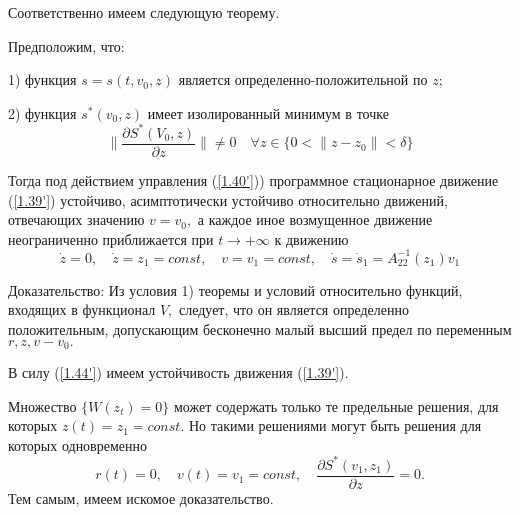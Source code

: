 Соответственно имеем следующую теорему.

\begin{theorem}\label{t-1.10}
Предположим, что:

1) функция $s = s(t, v_0, z)$ является определенно-положительной по $z$;

2) функция $s^{*} (v_0, z)$ имеет изолированный минимум в точке 
$$\| \frac{\partial S^{*} (V_0, z)}{\partial z} \| \ne 0 \quad \forall z \in \lbrace 0 < \| z - z_0 \| < \delta \rbrace$$

Тогда под действием управления (\ref{1.40'})) программное стационарное движение (\ref{1.39'}) устойчиво, асимптотически устойчиво относительно движений, отвечающих значению $v = v_0,$ а каждое иное возмущенное движение неограниченно приближается при $t \to + \infty$ к движению 
$$\dot z = 0, \quad \dot z = z_1 = const, \quad v = v_1 = const, \quad \dot s = \dot s_1 = A_{22}^{-1} (z_1) v_1$$
\end{theorem}

Доказательство:
Из условия 1) теоремы и условий относительно функций, входящих в функционал $V,$ следует, что он является определенно положительным, допускающим бесконечно малый высший предел по переменным $r, z, v - v_0.$

В силу (\ref{1.44'}) имеем устойчивость движения (\ref{1.39'}).

Множество $\lbrace W(z_t) = 0 \rbrace$ может содержать только те предельные решения, для которых $z(t) = z_1 = const.$ Но такими решениями могут быть решения для которых одновременно 
$$r(t) = 0, \quad v(t) = v_1 = const, \quad \frac{\partial S^{*} (v_1, z_1)}{\partial z} = 0.$$
Тем самым, имеем искомое доказательство. 